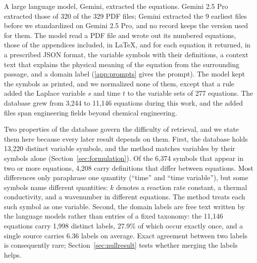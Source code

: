 A large language model, Gemini, extracted the equations. Gemini 2.5 Pro extracted those of 320 of
the 329 PDF files; Gemini extracted the 9 earliest files before we standardized on Gemini 2.5
Pro, and no record keeps the version used for them. The model read a PDF file and wrote
out its numbered equations, those of the appendices included, in \LaTeX{}, and for each equation
it returned, in a prescribed JSON format, the variable symbols with their definitions, a context
text that explains the physical meaning of the equation from the surrounding passage, and a domain
label (\ref{app:prompts} gives the prompt). The model kept the symbols as printed, and we
normalized none of them, except that a rule added the Laplace variable $s$ and time $t$ to the
variable sets of 277 equations.
The database grew from 3,244 to 11,146 equations during this work, and the added files span
engineering fields beyond chemical engineering.

Two properties of the database govern the difficulty of retrieval, and we state them here because
every later result depends on them. First, the database holds 13,220 distinct variable symbols, and
the method matches variables by their symbols alone (Section~\ref{sec:formulation}). Of the 6,374
symbols that appear in two or more equations, 4,208 carry definitions that differ between
equations. Most differences only paraphrase one quantity (``time'' and ``time variable''), but some
symbols name different quantities: $k$ denotes a reaction rate constant, a thermal conductivity,
and a wavenumber in different equations. The method treats each such symbol as one variable.
Second, the domain labels are free text written by the language models rather than entries of a
fixed taxonomy: the 11,146 equations carry 1,998 distinct labels, 27.9\% of which occur exactly
once, and a single source carries 6.36 labels on average. Exact agreement between two labels is
consequently rare; Section~\ref{sec:nullresult} tests whether merging the labels helps.

